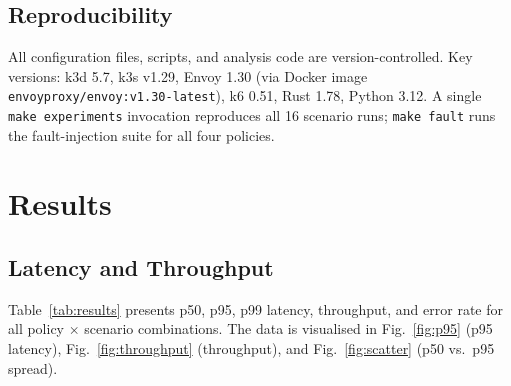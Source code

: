 \documentclass[conference]{IEEEtran}
\begin{document}
\subsection{Reproducibility}

All configuration files, scripts, and analysis code are version-controlled.
Key versions: k3d 5.7, k3s v1.29, Envoy 1.30 (via Docker image
\texttt{envoyproxy/envoy:v1.30-latest}), k6 0.51, Rust 1.78, Python 3.12.
A single \texttt{make experiments} invocation reproduces all 16 scenario runs;
\texttt{make fault} runs the fault-injection suite for all four policies.

\section{Results}
\label{sec:results}

\subsection{Latency and Throughput}

Table~\ref{tab:results} presents p50, p95, p99 latency, throughput, and
error rate for all policy $\times$ scenario combinations.
The data is visualised in Fig.~\ref{fig:p95} (p95 latency),
Fig.~\ref{fig:throughput} (throughput), and Fig.~\ref{fig:scatter}
(p50 vs.\ p95 spread).
\end{document}
